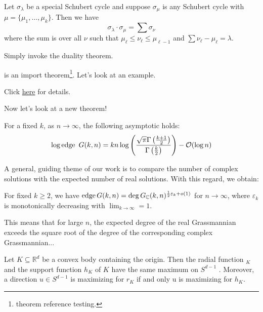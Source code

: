 \begin{thm}
Let $\sigma_\lambda$ be a special Schubert cycle and suppose $\sigma_\mu$ is any Schubert cycle with $\mu= \{\mu_1,\ldots,\mu_k\}$. Then we have 
$$ \sigma_\lambda\cdot \sigma_\mu = \sum \sigma_\nu$$
where the sum is over all $\nu$ such that $\mu_\ell \leqslant \nu_\ell \leqslant \mu_{\ell-1}$ and $\sum \nu_\ell -\mu_\ell = \lambda$.
\end{thm}

\begin{pf}
Simply invoke the duality theorem.
\end{pf}

\begin{remark}
 is an import theorem\footnote{theorem reference testing.}. Let's look at an example.
\end{remark}

\begin{ex}
Click \href{http://www.macs.hw.ac.uk/~simonm/schubertcalculusreview.pdf#page=14}{here} for details.
\end{ex}

Now let's look at a new theorem!

\begin{thm}
	For a fixed $k$, as $n\to\infty$, the following asymptotic holds:
	$$
	\log \operatorname{edge} ~ G(k,n)= kn \log\left(
	{\sqrt \pi \Gamma \left({k+1\over 2}\right) \over \Gamma \left({k\over 2}\right)}
	 \right)- \mathcal O (\log n)
	$$
\end{thm}

A general, guiding theme of our work is to compare the number of complex solutions with
the expected number of real solutions. With this regard, we obtain:

\begin{corr}
For fixed $k\ge 2$, we have $\operatorname{edge} G(k,n)=\deg G_{\mathbb C} (k,n)^{{1\over 2}\varepsilon_k+o(1)}$ for $n\to\infty$, where $\varepsilon_k$ is monotonically decreasing with $\lim_{k\to\infty}=1$. 
\end{corr}

\begin{remark}
This means that for large $n$, the expected degree of the real Grassmannian exceeds the square
root of the degree of the corresponding complex Grassmannian...
\end{remark}

\begin{lemma}
Let $K\subseteq \mathbb R^d$
be a convex body containing the origin. Then the radial function $_K$
and the support function $h_K$ of $K$ have the same maximum on $S^{d-1}$
. Moreover, a direction
$u\in S^{d-1}$
is maximizing for $r_K$ if and only u is maximizing for $h_K$.
\end{lemma}

